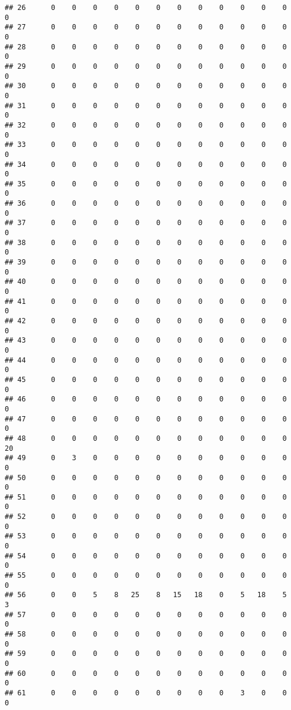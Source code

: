 \documentclass[]{article}
\begin{document}
\begin{verbatim}
## 26      0    0    0    0    0    0    0    0    0    0    0    0    0
## 27      0    0    0    0    0    0    0    0    0    0    0    0    0
## 28      0    0    0    0    0    0    0    0    0    0    0    0    0
## 29      0    0    0    0    0    0    0    0    0    0    0    0    0
## 30      0    0    0    0    0    0    0    0    0    0    0    0    0
## 31      0    0    0    0    0    0    0    0    0    0    0    0    0
## 32      0    0    0    0    0    0    0    0    0    0    0    0    0
## 33      0    0    0    0    0    0    0    0    0    0    0    0    0
## 34      0    0    0    0    0    0    0    0    0    0    0    0    0
## 35      0    0    0    0    0    0    0    0    0    0    0    0    0
## 36      0    0    0    0    0    0    0    0    0    0    0    0    0
## 37      0    0    0    0    0    0    0    0    0    0    0    0    0
## 38      0    0    0    0    0    0    0    0    0    0    0    0    0
## 39      0    0    0    0    0    0    0    0    0    0    0    0    0
## 40      0    0    0    0    0    0    0    0    0    0    0    0    0
## 41      0    0    0    0    0    0    0    0    0    0    0    0    0
## 42      0    0    0    0    0    0    0    0    0    0    0    0    0
## 43      0    0    0    0    0    0    0    0    0    0    0    0    0
## 44      0    0    0    0    0    0    0    0    0    0    0    0    0
## 45      0    0    0    0    0    0    0    0    0    0    0    0    0
## 46      0    0    0    0    0    0    0    0    0    0    0    0    0
## 47      0    0    0    0    0    0    0    0    0    0    0    0    0
## 48      0    0    0    0    0    0    0    0    0    0    0    0   20
## 49      0    3    0    0    0    0    0    0    0    0    0    0    0
## 50      0    0    0    0    0    0    0    0    0    0    0    0    0
## 51      0    0    0    0    0    0    0    0    0    0    0    0    0
## 52      0    0    0    0    0    0    0    0    0    0    0    0    0
## 53      0    0    0    0    0    0    0    0    0    0    0    0    0
## 54      0    0    0    0    0    0    0    0    0    0    0    0    0
## 55      0    0    0    0    0    0    0    0    0    0    0    0    0
## 56      0    0    5    8   25    8   15   18    0    5   18    5    3
## 57      0    0    0    0    0    0    0    0    0    0    0    0    0
## 58      0    0    0    0    0    0    0    0    0    0    0    0    0
## 59      0    0    0    0    0    0    0    0    0    0    0    0    0
## 60      0    0    0    0    0    0    0    0    0    0    0    0    0
## 61      0    0    0    0    0    0    0    0    0    3    0    0    0

\end{verbatim}
\end{document}
